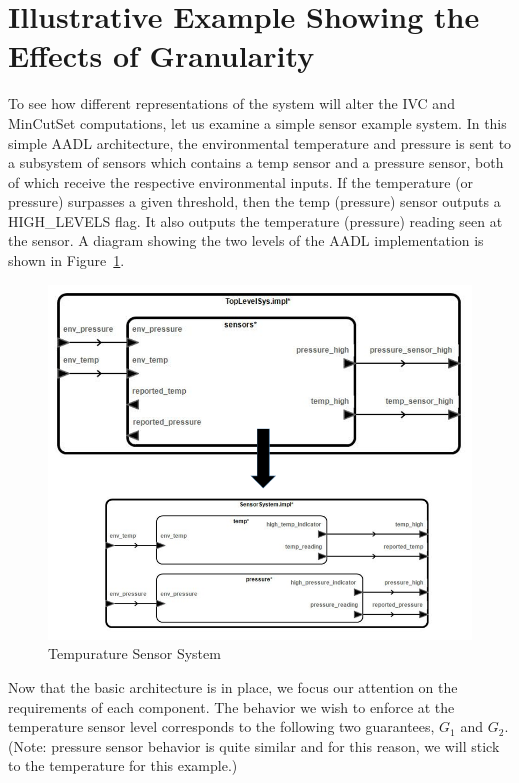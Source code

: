 \section{Illustrative Example Showing the Effects of Granularity}
To see how different representations of the system will alter the IVC and MinCutSet computations, let us examine a simple sensor example system. In this simple AADL architecture, the environmental temperature and pressure is sent to a subsystem of sensors which contains a temp sensor and a pressure sensor, both of which receive the respective environmental inputs. If the temperature (or pressure) surpasses a given threshold, then the temp (pressure) sensor outputs a HIGH\_LEVELS flag. It also outputs the temperature (pressure) reading seen at the sensor. A diagram showing the two levels of the AADL implementation is shown in Figure~\ref{fig:sensorGran1}.  

\begin{figure}[h]
\begin{center}
\includegraphics[width=14cm]{images/sensorGran.png}
\caption{Tempurature Sensor System} 
\label{fig:sensorGran1}
\end{center}
\end{figure}

Now that the basic architecture is in place, we focus our attention on the requirements of each component. The behavior we wish to enforce at the temperature sensor level corresponds to the following two guarantees, $G_1$ and $G_2$. (Note: pressure sensor behavior is quite similar and for this reason, we will stick to the temperature for this example.) 

